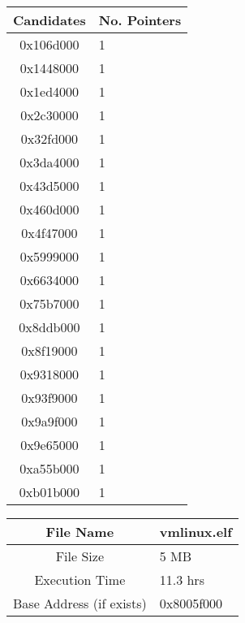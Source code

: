 \documentclass[letterpaper,twocolumn,10pt]{article}
\begin{document}
\begin{center}
    \begin{tabular}{| c | p{3cm} |}
        \hline
        Candidates & No. Pointers \\ \hline
        0x106d000 & 1\\ \hline
        0x1448000 & 1\\ \hline
        0x1ed4000 & 1\\ \hline
        0x2c30000 & 1\\ \hline
        0x32fd000 & 1\\ \hline
        0x3da4000 & 1\\ \hline
        0x43d5000 & 1\\ \hline
        0x460d000 & 1\\ \hline
        0x4f47000 & 1\\ \hline
        0x5999000 & 1\\ \hline
        0x6634000 & 1\\ \hline
        0x75b7000 & 1\\ \hline
        0x8ddb000 & 1\\ \hline
        0x8f19000 & 1\\ \hline
        0x9318000 & 1\\ \hline
        0x93f9000 & 1\\ \hline
        0x9a9f000 & 1\\ \hline
        0x9e65000 & 1\\ \hline
        0xa55b000 & 1\\ \hline
        0xb01b000 & 1\\ \hline
    \end{tabular}
        
    \begin{tabular}{| c | p{3cm} |}
        \hline
        File Name & vmlinux.elf\\ \hline
        File Size & 5 MB \\ \hline
        Execution Time & 11.3 hrs \\ \hline
        Base Address (if exists) &  0x8005f000\\ \hline
    \end{tabular}
    

\end{center}
\end{document}
